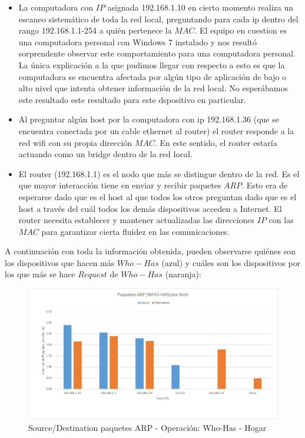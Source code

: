 \begin{itemize}
\item{La computadora con $IP$ asignada 192.168.1.10 en cierto momento realiza un escaneo sistemático de toda la red local, preguntando 
para cada ip dentro del rango 192.168.1.1-254 a quién pertenece la $MAC$. El equipo en cuestion es una computadora personal con Windows 7 instalado 
y nos resultó sorprendente observar este comportamiento para una computadora personal. 
La única explicación a la que pudimos llegar con respecto a esto es que la computadora se encuentra afectada por algún tipo de aplicación 
de bajo o alto nivel que intenta obtener información de la red local. No esperábamos este resultado este resultado para este dspositivo en particular.}

\item{Al preguntar algún host por la computadora con ip 192.168.1.36 (que se encuentra conectada por un cable ethernet al router) 
el router responde a la red wifi con su propia dirección $MAC$. En este sentido, el router estaría actuando como un bridge dentro de la red local.}

\item{El router (192.168.1.1) es el nodo que más se distingue dentro de la red. Es el que mayor interacción tiene en enviar y recibir 
paquetes $ARP$. Esto era de esperarse dado que es el host al que todos los otros preguntan dado que es el host a través del cuál 
todos los demás dispositivos acceden a Internet. El router necesita establecer y mantener actualizadas las direcciones $IP$ con las $MAC$ para
garantizar cierta fluidez en las comunicaciones.}

\end{itemize}

A continuación con toda la información obtenida, pueden observarse quiénes son los dispositivos que hacen más $Who-Has$ (azul) y 
cuáles son los dispositivos por los que más se hace $Request$ de $Who-Has$ (naranja):
\newpage

\begin{figure}[h!]
\centering
\includegraphics[scale=0.5]{./img/arp_whoHas_casa.jpg}
\caption{Source/Destination paquetes ARP - Operación: Who-Has - Hogar}
\end{figure}

